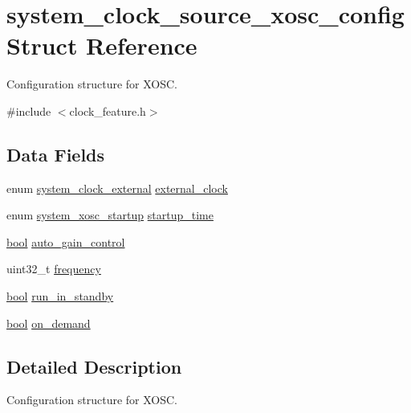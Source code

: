 \hypertarget{structsystem__clock__source__xosc__config}{}\section{system\+\_\+clock\+\_\+source\+\_\+xosc\+\_\+config Struct Reference}
\label{structsystem__clock__source__xosc__config}


Configuration structure for X\+O\+SC.  




{\ttfamily \#include $<$clock\+\_\+feature.\+h$>$}

\subsection*{Data Fields}
\begin{DoxyCompactItemize}
\item 
enum \mbox{\hyperlink{group__asfdoc__sam0__system__clock__group_gab463f9d80799466f12321e6252493e70}{system\+\_\+clock\+\_\+external}} \mbox{\hyperlink{structsystem__clock__source__xosc__config_aeced8f86ac9232f6fba8a4a13e5eae27}{external\+\_\+clock}}
\item 
enum \mbox{\hyperlink{group__asfdoc__sam0__system__clock__group_ga93797ad2901b27dd84fa8b7edc9bb5c5}{system\+\_\+xosc\+\_\+startup}} \mbox{\hyperlink{structsystem__clock__source__xosc__config_a147400a478d23555be9e54624a0251ca}{startup\+\_\+time}}
\item 
\mbox{\hyperlink{group__group__sam0__utils_ga97a80ca1602ebf2303258971a2c938e2}{bool}} \mbox{\hyperlink{structsystem__clock__source__xosc__config_ad22a6285703ad7cd0a9febbc8d8ecde9}{auto\+\_\+gain\+\_\+control}}
\item 
uint32\+\_\+t \mbox{\hyperlink{structsystem__clock__source__xosc__config_ab632fb0b4d5156ea4df0b1e15410e913}{frequency}}
\item 
\mbox{\hyperlink{group__group__sam0__utils_ga97a80ca1602ebf2303258971a2c938e2}{bool}} \mbox{\hyperlink{structsystem__clock__source__xosc__config_a514964d5c2a8da4dd96bac82a53477f2}{run\+\_\+in\+\_\+standby}}
\item 
\mbox{\hyperlink{group__group__sam0__utils_ga97a80ca1602ebf2303258971a2c938e2}{bool}} \mbox{\hyperlink{structsystem__clock__source__xosc__config_a23620c12634b9230d2325ec5c245cf32}{on\+\_\+demand}}
\end{DoxyCompactItemize}


\subsection{Detailed Description}
Configuration structure for X\+O\+SC. 

